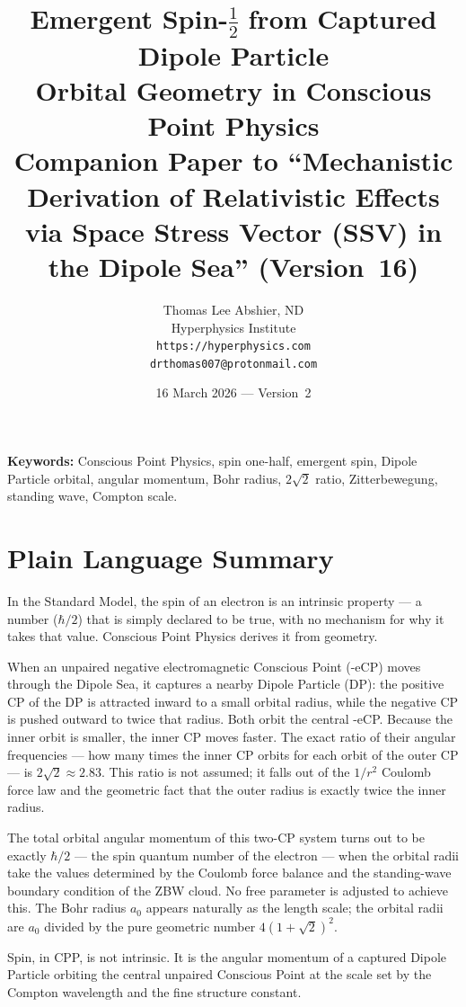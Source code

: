 \documentclass[12pt]{article}
\title{\textbf{Emergent Spin-$\tfrac{1}{2}$ from Captured Dipole Particle\\
Orbital Geometry in Conscious Point Physics}\\[6pt]
{\large Companion Paper to ``Mechanistic Derivation of Relativistic Effects\\
via Space Stress Vector (SSV) in the Dipole Sea'' (Version~16)}}
\author{Thomas Lee Abshier, ND\\
Hyperphysics Institute\\
\texttt{https://hyperphysics.com}\\
\texttt{drthomas007@protonmail.com}}
\date{16 March 2026 --- Version~2}
\newcommand{\aBohr}{a_0}
\begin{document}
\maketitle

\noindent\textbf{Keywords:} Conscious Point Physics, spin one-half,
emergent spin, Dipole Particle orbital, angular momentum, Bohr radius,
$2\sqrt{2}$ ratio, Zitterbewegung, standing wave, Compton scale.

\section*{Plain Language Summary}

In the Standard Model, the spin of an electron is an intrinsic property
--- a number ($\hbar/2$) that is simply declared to be true, with no
mechanism for why it takes that value.  Conscious Point Physics derives
it from geometry.

When an unpaired negative electromagnetic Conscious Point (-eCP) moves
through the Dipole Sea, it captures a nearby Dipole Particle (DP): the
positive CP of the DP is attracted inward to a small orbital radius,
while the negative CP is pushed outward to twice that radius.  Both
orbit the central -eCP.  Because the inner orbit is smaller, the inner
CP moves faster.  The exact ratio of their angular frequencies --- how
many times the inner CP orbits for each orbit of the outer CP --- is
$2\sqrt{2} \approx 2.83$.  This ratio is not assumed; it falls out of
the $1/r^2$ Coulomb force law and the geometric fact that the outer
radius is exactly twice the inner radius.

The total orbital angular momentum of this two-CP system turns out to
be exactly $\hbar/2$ --- the spin quantum number of the electron ---
when the orbital radii take the values determined by the Coulomb force
balance and the standing-wave boundary condition of the ZBW cloud.  No
free parameter is adjusted to achieve this.  The Bohr radius $\aBohr$
appears naturally as the length scale; the orbital radii are $\aBohr$
divided by the pure geometric number $4(1+\sqrt{2})^2$.

Spin, in CPP, is not intrinsic.  It is the angular momentum of a
captured Dipole Particle orbiting the central unpaired Conscious Point
at the scale set by the Compton wavelength and the fine structure
constant.
\end{document}
